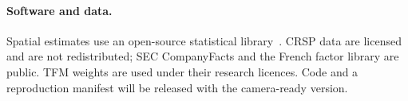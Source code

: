 \documentclass[letterpaper]{article} %
\theoremstyle{definition}
\begin{document}
\begin{table}[t]
  \centering\small
  
  \caption{Every out-of-sample model: training spatial coefficient, mean
    Gaussian log score per issuer-month (lower is better), change against APT
    ($\times10^3$, positive favours the model) and minimum-variance volatility.}
  \label{tab:aptfull}
\end{table}

\paragraph{Software and data.} Spatial estimates use an open-source statistical
library~\citep{anonymous2026}. CRSP data are licensed and are not
redistributed; SEC CompanyFacts and the French factor library are public. TFM
weights are used under their research licences. Code and a reproduction
manifest will be released with the camera-ready version.
\end{document}
